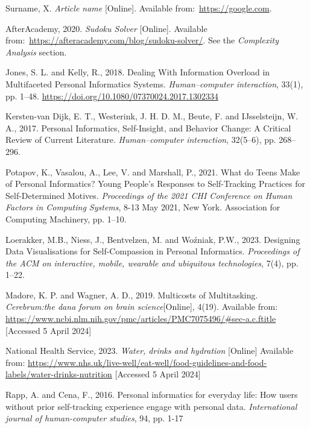 \documentclass[12pt]{article}
\begin{document}
\renewcommand{\refname}{} 
\vspace{-20pt}
\begin{thebibliography}{99}
     Surname, X. \textit{Article name} [Online].
    Available from:~\url{https://google.com}.

     AfterAcademy, 2020. \textit{Sudoku Solver} [Online].
    Available from:~\url{https://afteracademy.com/blog/sudoku-solver/}. See the
    \textit{Complexity Analysis} section.

    Jones, S. L. and Kelly, R., 2018. 
    Dealing With Information Overload in Multifaceted Personal Informatics Systems. 
    \textit{Human–computer interaction}, 33(1), pp. 1–48. \url{https://doi.org/10.1080/07370024.2017.1302334}

    Kersten-van Dijk, E. T., Westerink, J. H. D. M., Beute, F. and 
    IJsselsteijn, W. A., 2017. 
    Personal Informatics, Self-Insight, and Behavior Change: A Critical Review of Current Literature. 
    \textit{Human–computer interaction}, 32(5–6), pp. 268–296.

    Potapov, K., Vasalou, A., Lee, V. and Marshall, P., 2021. 
    What do Teens Make of Personal Informatics? 
    Young People's Responses to Self-Tracking Practices for Self-Determined Motives. 
    \textit{Proceedings of the 2021 CHI Conference on Human Factors in Computing Systems}, 
    8-13 May 2021, New York. Association for Computing Machinery, pp. 1–10.

    Loerakker, M.B., Niess, J., Bentvelzen, M. and Woźniak, P.W., 2023. 
    Designing Data Visualisations for Self-Compassion in Personal Informatics. 
    \textit{Proceedings of the ACM on interactive, mobile, wearable and ubiquitous technologies}, 7(4), pp. 1–22.

    Madore, K. P. and Wagner, A. D., 2019. Multicosts of Multitasking. 
    \textit{Cerebrum:the dana forum on brain science}[Online], 4(19). Available from:
    \url{https://www.ncbi.nlm.nih.gov/pmc/articles/PMC7075496/#sec-a.c.ftitle} 
    [Accessed 5 April 2024]

    National Health Service, 2023. \textit{Water, drinks and hydration} [Online] 
    Available from: 
    \url{https://www.nhs.uk/live-well/eat-well/food-guidelines-and-food-labels/water-drinks-nutrition} 
    [Accessed 5 April 2024]
    
    Rapp, A. and Cena, F., 2016. Personal informatics for everyday life: 
    How users without prior self-tracking experience engage with personal data. 
    \textit{International journal of human-computer studies}, 94, pp. 1-17


\end{thebibliography}
\end{document}
